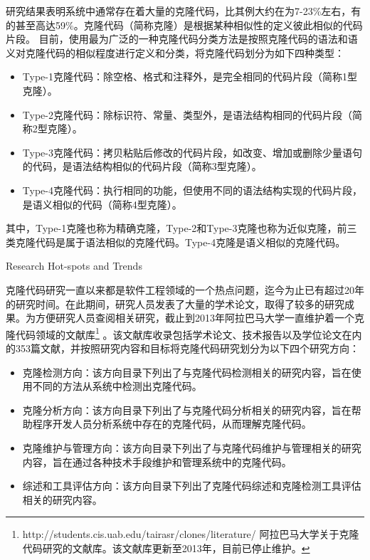 研究结果表明系统中通常存在着大量的克隆代码，比其例大约在为7-23\%左右，有的甚至高达59\%。克隆代码（简称克隆）是根据某种相似性的定义彼此相似的代码片段\cite{roy2007survey}。%
目前，使用最为广泛的一种克隆代码分类方法是按照克隆代码的语法和语义对克隆代码的相似程度进行定义和分类\cite{koschke2007survey}，将克隆代码划分为如下四种类型：
\begin{itemize}
\item {Type-1克隆代码：除空格、格式和注释外，是完全相同的代码片段（简称1型克隆）。}
\item {Type-2克隆代码：除标识符、常量、类型外，是语法结构相同的代码片段（简称2型克隆）。}
\item {Type-3克隆代码：拷贝粘贴后修改的代码片段，如改变、增加或删除少量语句的代码，是语法结构相似的代码片段（简称3型克隆）。}
\item {Type-4克隆代码：执行相同的功能，但使用不同的语法结构实现的代码片段，是语义相似的代码（简称4型克隆）。}
\end{itemize}

其中，Type-1克隆也称为精确克隆，Type-2和Type-3克隆也称为近似克隆，前三类克隆代码是属于语法相似的克隆代码。Type-4克隆是语义相似的克隆代码。


{Research Hot-spots and Trends}

克隆代码研究一直以来都是软件工程领域的一个热点问题，迄今为止已有超过20年的研究时间。在此期间，研究人员发表了大量的学术论文，取得了较多的研究成果。为方便研究人员查阅相关研究，截止到2013年阿拉巴马大学一直维护着一个克隆代码领域的文献库\footnote{ http://students.cis.uab.edu/tairasr/clones/literature/ 阿拉巴马大学关于克隆代码研究的文献库。该文献库更新至2013年，目前已停止维护。} 。该文献库收录包括学术论文、技术报告以及学位论文在内的353篇文献，并按照研究内容和目标将克隆代码研究划分为以下四个研究方向：

\begin{itemize}
\item 
克隆检测方向：该方向目录下列出了与克隆代码检测相关的研究内容，旨在使用不同的方法从系统中检测出克隆代码。
\item 
克隆分析方向：该方向目录下列出了与克隆代码分析相关的研究内容，旨在帮助程序开发人员分析系统中存在的克隆代码，从而理解克隆代码。
\item 
克隆维护与管理方向：该方向目录下列出了与克隆代码维护与管理相关的研究内容，旨在通过各种技术手段维护和管理系统中的克隆代码。
\item 
综述和工具评估方向：该方向目录下列出了克隆代码综述和克隆检测工具评估相关的研究内容。
\end{itemize}

